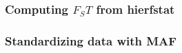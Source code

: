 \begin{frame}
\frametitle{Computing $F_ST$ from hierfstat}
\end{frame}

\begin{frame}
\frametitle{Standardizing data with MAF}
\end{frame}